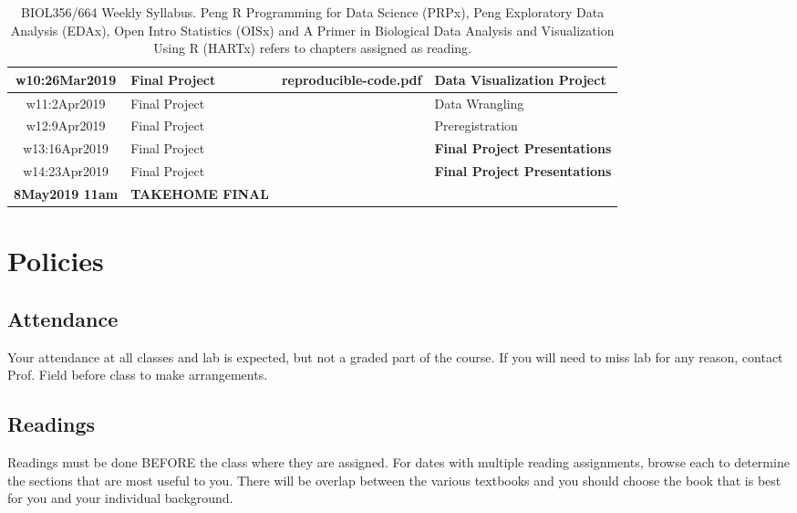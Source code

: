 \documentclass[11pt]{article} %
\begin{document}
\begin{table}[ht]
\begin{tabular}{| c | p{5cm} | p{3cm} | p{5.5cm} |}
	\hline
	w10:26Mar2019 & Final Project & reproducible-code.pdf &  {\bf Data Visualization Project} \\
	\hline
	w11:2Apr2019 & Final Project &  & Data Wrangling  \\
	\hline
	w12:9Apr2019 & Final Project &  & Preregistration  \\
	\hline
	w13:16Apr2019 & Final Project &  & {\bf Final Project Presentations} \\
	\hline 
	w14:23Apr2019 & Final Project & & {\bf Final Project Presentations}  \\ 
	\hline
	\hline
	\hline
	{\bf 8May2019 11am}	  & {\bf TAKEHOME FINAL} &   &  \\
	\hline
	\hline
\end{tabular}
 
\caption{BIOL356/664 Weekly Syllabus. Peng R Programming for Data Science (PRPx), Peng Exploratory Data Analysis (EDAx), Open Intro Statistics (OISx) and A Primer in Biological Data Analysis and Visualization Using R (HARTx) refers to chapters assigned as reading. }
\label{table:Syllabus} %
\end{table} 

\FloatBarrier



\section{Policies}

  \subsection{Attendance}
  
    Your attendance at all classes and lab is expected, but not a graded part of the course. If you will need to miss lab for any reason, contact Prof. Field before class to make arrangements.
  
  \subsection{Readings}
  
    Readings must be done BEFORE the class where they are assigned. For dates with multiple reading assignments, browse each to determine the sections that are most useful to you. There will be overlap between the various textbooks and you should choose the book that is best for you and your individual background.
  
\end{document}
